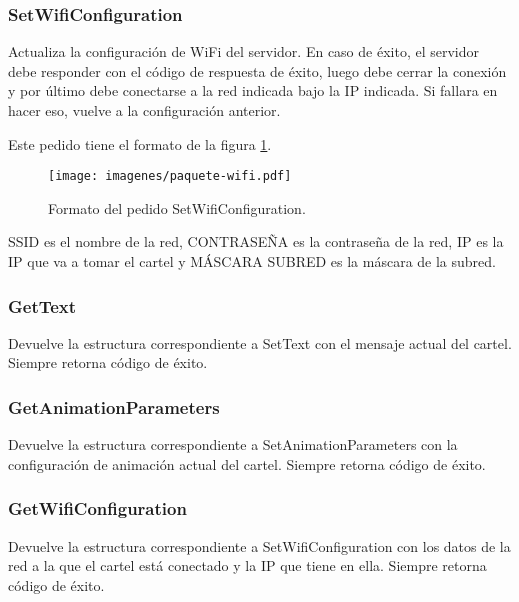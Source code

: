 \subsubsection{SetWifiConfiguration}
Actualiza la configuración de WiFi del servidor. En caso de éxito, el servidor debe responder con el código de respuesta de éxito, luego debe cerrar la conexión y por último debe conectarse a la red indicada bajo la IP indicada. Si fallara en hacer eso, vuelve a la configuración anterior.

Este pedido tiene el formato de la figura \ref{fig:paquete-wifi}.
\begin{figure}[h]
	\centering
	\label{fig:paquete-wifi}
	\texttt{[image: imagenes/paquete-wifi.pdf]}
		\caption{Formato del pedido SetWifiConfiguration.}
\end{figure}

SSID es el nombre de la red, CONTRASEÑA es la contraseña de la red, IP es la IP que va a tomar el cartel y MÁSCARA SUBRED es la máscara de la subred.

\subsubsection{GetText}
Devuelve la estructura correspondiente a SetText con el mensaje actual del cartel.
Siempre retorna código de éxito.

\subsubsection{GetAnimationParameters}
Devuelve la estructura correspondiente a SetAnimationParameters con la configuración de animación actual del cartel.
Siempre retorna código de éxito.

\subsubsection{GetWifiConfiguration}
Devuelve la estructura correspondiente a SetWifiConfiguration con los datos de la red a la que el cartel está conectado y la IP que tiene en ella.
Siempre retorna código de éxito.
